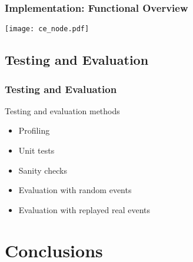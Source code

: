 \documentclass[10pt]{beamer}
\begin{document}
\begin{frame}
	\frametitle{Implementation: Functional Overview}
	\begin{center}\texttt{[image: ce\_node.pdf]}\end{center}
\end{frame}

\subsection{Testing and Evaluation}

\begin{frame}
	\frametitle{Testing and Evaluation}
	\begin{block}{Testing and evaluation methods}
		\begin{itemize}
			\item Profiling
			\item Unit tests
			\item Sanity checks
			\item Evaluation with random events
			\item Evaluation with replayed real events
		\end{itemize}
	\end{block}
\end{frame}

\section{Conclusions}
\end{document}
